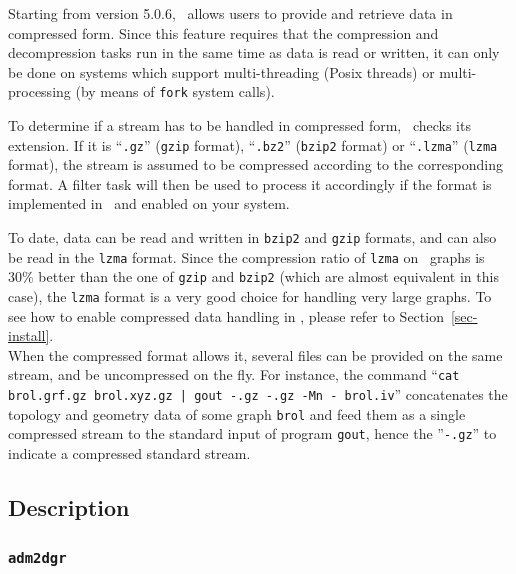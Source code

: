 Starting from version 5.0.6, \scotch\ allows users to provide and
retrieve data in compressed form. Since this feature requires that
the compression and decompression tasks run in the same time as data
is read or written, it can only be done on systems which support
multi-threading (Posix threads) or multi-processing (by means of
{\tt fork} system calls).

To determine if a stream has to be handled in compressed form,
\scotch\ checks its extension. If it is ``{\tt .gz}'' ({\tt gzip}
format), ``{\tt .bz2}'' ({\tt bzip2} format) or ``{\tt .lzma}''
({\tt lzma} format), the stream is assumed to be compressed according
to the corresponding format. A filter task will then be used to process
it accordingly if the format is implemented in \scotch\ and enabled on
your system.

To date, data can be read and written in {\tt bzip2} and {\tt gzip}
formats, and can also be read in the {\tt lzma} format. Since the
compression ratio of {\tt lzma} on \scotch\ graphs is $30\%$ better
than the one of {\tt gzip} and {\tt bzip2} (which are almost
equivalent in this case), the {\tt lzma} format is a very good choice
for handling very large graphs. To see how to enable compressed data
handling in \scotch, please refer to Section~\ref{sec-install}.
\\

When the compressed format allows it, several files can be provided on
the same stream, and be uncompressed on the fly. For instance, the
command ``{\tt cat brol.grf.gz brol.xyz.gz | gout -.gz -.gz -Mn -
brol.iv}'' concatenates the topology and geometry data of some graph
{\tt brol} and feed them as a single compressed stream to the standard
input of program {\tt gout}, hence the ''{\tt -.gz}'' to indicate a
compressed standard stream.

\subsection{Description}

\subsubsection{\texttt{adm2dgr}}
\label{sec-prog-admtodgr}

